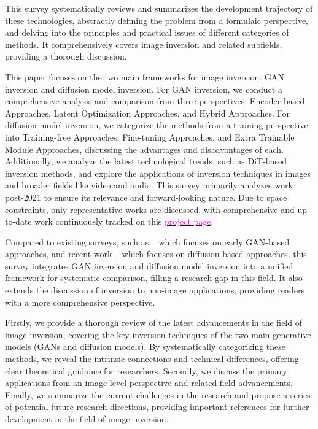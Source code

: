 This survey systematically reviews and summarizes the development trajectory of these technologies, abstractly defining the problem from a formulaic perspective, and delving into the principles and practical issues of different categories of methods. It comprehensively covers image inversion and related subfields, providing a thorough discussion.


This paper focuses on the two main frameworks for image inversion: GAN inversion and diffusion model inversion. For GAN inversion, we conduct a comprehensive analysis and comparison from three perspectives: Encoder-based Approaches, Latent Optimization Approaches, and Hybrid Approaches. For diffusion model inversion, we categorize the methods from a training perspective into Training-free Approaches, Fine-tuning Approaches, and Extra Trainable Module Approaches, discussing the advantages and disadvantages of each. Additionally, we analyze the latest technological trends, such as DiT-based inversion methods\cite{DiT4Edit}, and explore the applications of inversion techniques in images and broader fields like video\cite{Videoshop} and audio\cite{ZETA}. This survey primarily analyzes work post-2021 to ensure its relevance and forward-looking nature. Due to space constraints, only representative works are discussed, with comprehensive and up-to-date work continuously tracked on this \href{https://github.com/RyanChenYN/ImageInversion}{\textcolor{magenta}{project page}}.

Compared to existing surveys, such as ~\cite{survey1} which focuses on early GAN-based approaches, and recent work ~\cite{survey2} which focuses on diffusion-based approaches, this survey integrates GAN inversion and diffusion model inversion into a unified framework for systematic comparison, filling a research gap in this field. It also extends the discussion of inversion to non-image applications, providing readers with a more comprehensive perspective.

Firstly, we provide a thorough review of the latest advancements in the field of image inversion, covering the key inversion techniques of the two main generative models (GANs and diffusion models). By systematically categorizing these methods, we reveal the intrinsic connections and technical differences, offering clear theoretical guidance for researchers. Secondly, we discuss the primary applications from an image-level perspective and related field advancements. Finally, we summarize the current challenges in the research and propose a series of potential future research directions, providing important references for further development in the field of image inversion.


